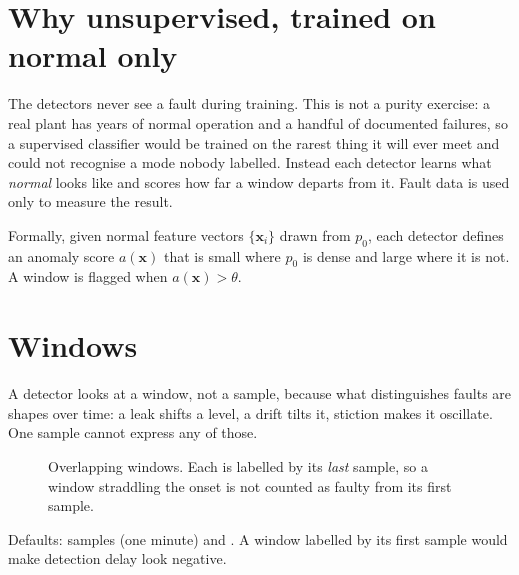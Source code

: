 \section{Why unsupervised, trained on normal only}

The detectors never see a fault during training. This is not a purity
exercise: a real plant has years of normal operation and a handful of
documented failures, so a supervised classifier would be trained on the rarest
thing it will ever meet and could not recognise a mode nobody labelled.
Instead each detector learns what \emph{normal} looks like and scores how far
a window departs from it. Fault data is used only to measure the result.

Formally, given normal feature vectors $\{\bm x_i\}$ drawn from $p_0$, each
detector defines an anomaly score $a(\bm x)$ that is small where $p_0$ is
dense and large where it is not. A window is flagged when $a(\bm x) > \theta$.

\section{Windows}

A detector looks at a window, not a sample, because what distinguishes faults
are shapes over time: a leak shifts a level, a drift tilts it, stiction makes
it oscillate. One sample cannot express any of those.

\begin{figure}[htbp]
\centering
{}
\caption{Overlapping windows. Each is labelled by its \emph{last} sample, so a
window straddling the onset is not counted as faulty from its first sample.}
\label{fig:windows}
\end{figure}

Defaults:  samples (one minute) and . A
window labelled by its first sample would make detection delay look negative.

